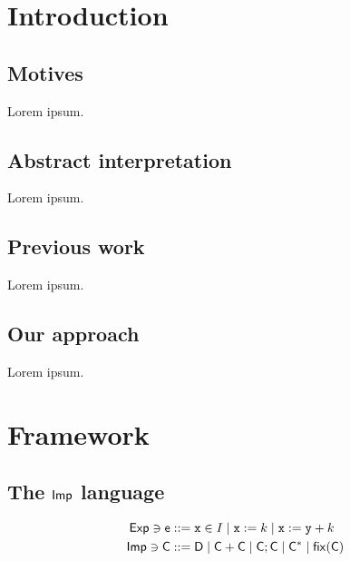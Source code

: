 \documentclass{beamer}
\begin{document}
\section{Introduction}
\subsection{Motives}
\begin{frame}
  Lorem ipsum.
\end{frame}
\subsection{Abstract interpretation}
\begin{frame}[History]
  Lorem ipsum.
\end{frame}
\subsection{Previous work}
\begin{frame}
  Lorem ipsum.
\end{frame}
\subsection{Our approach}
\begin{frame}
  Lorem ipsum.
\end{frame}

\section{Framework}
\subsection{The \(\mathsf{Imp}\) language}
\begin{frame}
\begin{align*}
  \expr \ni \com[e] ::= & \; \var \in I %
                          \mid \var := k \mid \var := \var[y] + k %
  \\
  \imp \ni \com[C] ::= & \; \com[D] \mid \com + \com \mid \com ; \com \mid \com^* \mid \fix{\com}
\end{align*}
\end{frame}
\begin{frame}

\end{frame}
\end{document}

